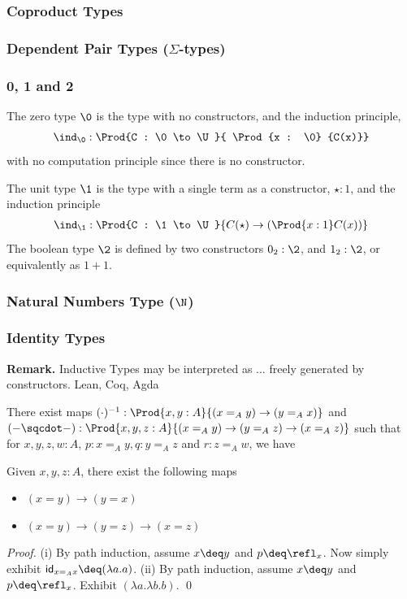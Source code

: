 \subsubsection{Coproduct Types}

\subsubsection{Dependent Pair Types ($\Sigma$-types)}

\subsubsection{0, 1 and 2}
The zero type $\0$ is the type with no constructors, and the induction principle, 
\begin{align*}
  \ind_\0 : \Prod{C : \0 \to \U}{ \Prod{x : \0} {C(x)}}
\end{align*}
with no computation principle since there is no constructor.

The unit type $\1$ is the type with a single term as a constructor, $\star : 1$, and the induction principle
\begin{align*}
  \ind_{\1} : \Prod{C : \1 \to \U}{C(\star) \to \left(\Prod{x : 1} C(x)\right)}
\end{align*}
The boolean type $\2$ is defined by two constructors $0_2 : \2$, and $1_2 : \2$, or equivalently as $1 + 1$.

\subsubsection{Natural Numbers Type ($\N$)}

\subsubsection{Identity Types}

\textbf{Remark.} Inductive Types may be interpreted as ...
freely generated by constructors.
Lean, Coq, Agda


\begin{proposition}
  There exist maps $(\cdot)^{-1} : \Prod{x, y : A}{(x =_A y) \to (y =_A x)}$ and $(-\sqcdot-) : \Prod{x,y,z :A}{(x =_A y) \to (y =_A z) \to (x =_A z)}$
  such that for $x, y, z, w : A$, $p : x =_A y, q : y =_A z$ and $r : z =_A w$, we have
\end{proposition}

\begin{proposition}
  Given $x, y, z : A$, there exist the following maps 
  \begin{itemize}
    \item [(i)] $(x = y) \to (y = x)$
    \item [(ii)] $(x = y) \to (y = z) \to (x = z)$
  \end{itemize}
\end{proposition}
\textit{Proof.} (i) By path induction, assume $x \deq y$ and $p \deq \refl_x$. Now simply exhibit $\mathsf{id}_{x =_A x} \deq (\lambda a.a)$. 
(ii) By path induction, assume $x \deq y$ and $p \deq \refl_x$. Exhibit $(\lambda a.\lambda b.b)$. \qed

